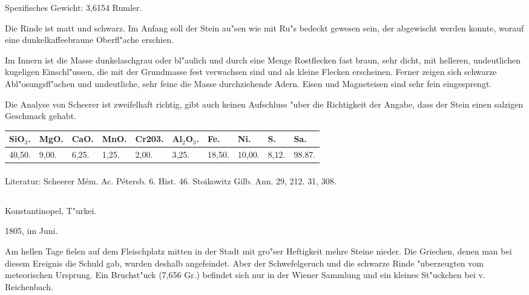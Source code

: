\documentclass[a4paper, 11pt, oneside]{article}
\begin{document}
Spezifisches Gewicht: 3,6154 Rumler.

Die Rinde ist matt und schwarz. Im Anfang soll der Stein au"sen wie mit Ru"s bedeckt gewesen sein, der abgewischt werden konnte, worauf eine dunkelkaffeebraune Oberfl"ache erschien.

Im Innern ist die Masse dunkelaschgrau oder bl"aulich und durch eine Menge Rostflecken fast braun, sehr dicht, mit helleren, undeutlichen kugeligen Einschl"ussen, die mit der Grundmasse fest verwachsen sind und als kleine Flecken erscheinen. Ferner zeigen sich schwarze Abl"osungsfl"achen und undeutliche, sehr feine die Masse durchziehende Adern. Eisen und Magneteisen sind sehr fein eingesprengt.

Die Analyse von Scheerer ist zweifelhaft richtig, gibt auch keinen Aufschluss "uber die Richtigkeit der Angabe, dass der Stein einen salzigen Geschmack gehabt.
\begin{table}[!ht]
    \centering\swabfamily\Large
    \normalsize
    \begin{tabular}{l l l l l l l l l l}
        SiO$_{3}$. & MgO. & CaO. & MnO. & Cr203. & Al$_{2}$O$_{3}$. & Fe. & Ni. & S. & Sa. \\ \hline
        40,50. & 9,00. & 6,25. & 1,25. & 2,00. & 3,25. & 18,50. & 10,00. & 8,12. & 98.87. \\
    \end{tabular}
\end{table}
\normalsize
\paragraph{}
Literatur: Scheerer Mém. Ac. Pétersb. 6. Hist. 46. Stoikowitz Gilb. Ann. 29, 212. 31, 308.
\subsection{}
\LARGE
\paragraph{}
Konstantinopel, T"urkei.

1805, im Juni.

Am hellen Tage fielen auf dem Fleischplatz mitten in der Stadt mit gro"ser Heftigkeit mehre Steine nieder. Die Griechen, denen man bei diesem Ereignis die Schuld gab, wurden deshalb angefeindet. Aber der Schwefelgeruch und die schwarze Rinde "uberzeugten vom meteorischen Ursprung. Ein Bruchst"uck (7,656 Gr.) befindet sich nur in der Wiener Sammlung und ein kleines St"uckchen bei v. Reichenbach.
\end{document}

